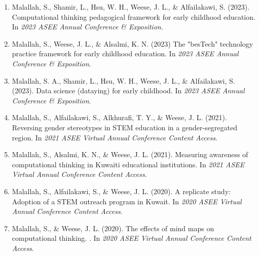 \documentclass[11pt]{article}
\begin{document}
\begin{enumerate}
\item Malallah, S., Shamir, L., Hsu, W. H., Weese, J. L., \& Alfailakawi, S. (2023). Computational thinking pedagogical framework for early childhood education. In \textit{2023 ASEE Annual Conference \& Exposition}.

\item Malallah, S., Weese, J. L., \& Alsalmi, K. N. (2023) The "besTech" technology practice framework for early childhood education. In \textit{2023 ASEE Annual Conference \& Exposition}.

\item Malallah, S. A., Shamir, L., Hsu, W. H., Weese, J. L., \& Alfailakawi, S. (2023). Data science (dataying) for early childhood. In \textit{2023 ASEE Annual Conference \& Exposition}.

\item Malallah, S., Alfailakawi, S., Alkhurafi, T. Y., \& Weese, J. L. (2021). Reversing gender stereotypes in STEM education in a gender-segregated region. In \textit{2021 ASEE Virtual Annual Conference Content Access}.

\item Malallah, S., Alsalmi, K. N., \& Weese, J. L. (2021). Measuring awareness of computational thinking in Kuwaiti educational institutions. In \textit{2021 ASEE Virtual Annual Conference Content Access}.

\item Malallah, S., Alfailakawi, S., \& Weese, J. L. (2020). A replicate study: Adoption of a STEM outreach program in Kuwait. In \textit{2020 ASEE Virtual Annual Conference Content Access}.

\item Malallah, S., \& Weese, J. L. (2020). The effects of mind maps on computational thinking. . In \textit{2020 ASEE Virtual Annual Conference Content Access}.

\end{enumerate}
\end{document}
